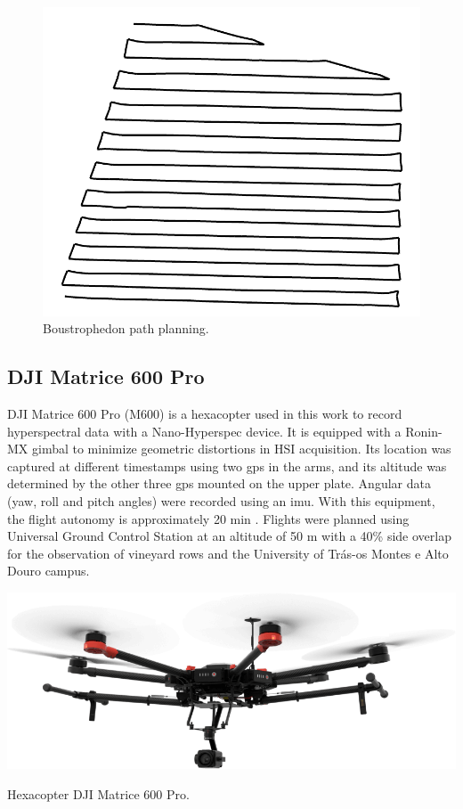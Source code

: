 \begin{figure}[ht]
	\includegraphics[width=.5\linewidth]{figs/materials/boustrophedon.png}
	\caption{Boustrophedon path planning.}
    \label{fig:boustrophedon}
\end{figure}

\subsection{DJI Matrice 600 Pro}

DJI Matrice 600 Pro (M600) is a hexacopter used in this work to record hyperspectral data with a Nano-Hyperspec device. It is equipped with a Ronin-MX gimbal to minimize geometric distortions in HSI acquisition. Its location was captured at different timestamps using two \acrshort{gps} in the arms, and its altitude was determined by the other three \acrshort{gps} mounted on the upper plate. Angular data (yaw, roll and pitch angles) were recorded using an \acrshort{imu}. With this equipment, the flight autonomy is approximately 20 \si{\minute} \cite{sousa_uav-based_2022}. Flights were planned using Universal Ground Control Station at an altitude of 50 \si{\meter} with a 40\% side overlap for the observation of vineyard rows and the University of Trás-os Montes e Alto Douro campus.
\begin{marginfigure}[-2.0cm]
	\includegraphics{figs/materials/dji_matrice_600_pro.png}
	\caption{Hexacopter DJI Matrice 600 Pro.}
	\label{fig:dji_matrice_600_pro}
\end{marginfigure}

